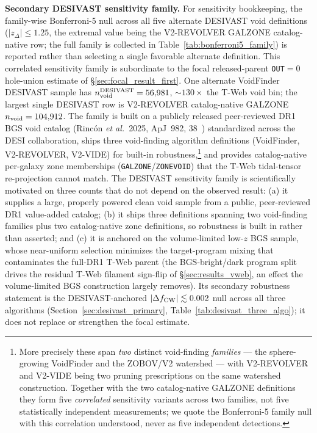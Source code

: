 \documentclass[aps,prd,twocolumn,superscriptaddress,showpacs,preprintnumbers,nofootinbib,longbibliography,floatfix]{revtex4-2}
\begin{document}
\textbf{Secondary DESIVAST sensitivity family.}
For sensitivity bookkeeping, the family-wise Bonferroni-5 null across
all five alternate DESIVAST void definitions
($|z_\Delta|\!\le\!1.25$, the extremal value being the V2-REVOLVER
GALZONE catalog-native row; the full family is collected in
Table~\ref{tab:bonferroni5_family}) is reported rather than selecting a
single favorable alternate definition. This correlated sensitivity
family is subordinate to the focal released-parent \texttt{OUT}$=0$
hole-union estimate of \S\ref{sec:focal_result_first}. One alternate
VoidFinder DESIVAST sample has $n_{\rm void}^{\rm DESIVAST} =
56{,}981$, ${\sim}130\times$ the T-Web void bin; the largest single DESIVAST row
is V2-REVOLVER catalog-native GALZONE $n_{\rm void}=104{,}912$. The family is built on a
publicly released peer-reviewed
DR1 BGS void catalog (Rinc\'on \textit{et al.}\ 2025,
ApJ~982, 38~\cite{DESIVAST2025}) standardized across the
DESI collaboration, ships three void-finding algorithm
definitions (VoidFinder, V2-REVOLVER, V2-VIDE) for built-in
robustness,\footnote{More precisely these span \emph{two} distinct
void-finding \emph{families} --- the sphere-growing VoidFinder and the
ZOBOV/V2 watershed --- with V2-REVOLVER and V2-VIDE being two pruning
prescriptions on the same watershed construction. Together with the two
catalog-native GALZONE definitions they form five \emph{correlated}
sensitivity variants across two families, not five statistically
independent measurements; we quote the Bonferroni-5 family null with
this correlation understood, never as five independent detections.}
and
provides catalog-native per-galaxy zone memberships
(\texttt{GALZONE}/\texttt{ZONEVOID}) that the T-Web tidal-tensor
re-projection cannot match. The DESIVAST sensitivity family is
scientifically motivated on three
counts that do not depend on the observed result: (a) it supplies a
large, properly powered clean void sample from a public, peer-reviewed
DR1 value-added catalog; (b) it ships three definitions spanning two
void-finding families plus two catalog-native zone definitions, so robustness is
built in rather than asserted; and (c) it is anchored on the
volume-limited low-$z$ BGS sample, whose near-uniform selection
minimizes the target-program mixing that contaminates the full-DR1
T-Web parent (the BGS-bright/dark program split drives the residual
T-Web filament sign-flip of \S\ref{sec:results_vweb}, an effect the
volume-limited BGS construction largely removes). Its secondary
robustness statement is the DESIVAST-anchored
$|\Delta f_{\rm CW}| \lesssim 0.002$ null across all three algorithms
(Section~\ref{sec:desivast_primary}, Table~\ref{tab:desivast_three_algo});
it does not replace or strengthen the focal estimate.
\end{document}
